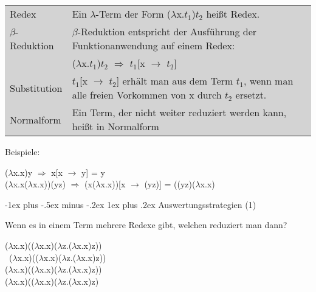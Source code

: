 \documentclass[10pt]{article}
\makeatletter
\renewcommand{\subsubsection}{\@startsection{subsubsection}{3}{0mm}%
                                {-1ex plus -.5ex minus -.2ex}%
                                {1ex plus .2ex}%
                                {\normalfont\small\bfseries}}
\makeatother
\begin{document}
\colorbox{lightgray}{ \begin{minipage}[h]{1.0\linewidth}
    \begin{tabular}{|p{4cm}|p{7cm}|}
      Redex             & Ein $\lambda$-Term der Form ($\lambda$x.$t_1$)$t_2$ heißt Redex.                                                      \\[\normalbaselineskip]
      $\beta$-Reduktion & $\beta$-Reduktion entspricht der Ausführung der Funktionanwendung auf einem Redex:                                    \\[\normalbaselineskip]
                        & ($\lambda$x.$t_1$)$t_2$ $\Rightarrow$ $t_1$[x $\rightarrow$ $t_2$]                                                    \\[\normalbaselineskip]
      Substitution      & $t_1$[x $\rightarrow$ $t_2$] erhält man aus dem Term $t_1$, wenn man alle freien Vorkommen von x durch $t_2$ ersetzt. \\[\normalbaselineskip]
      Normalform        & Ein Term, der nicht weiter reduziert werden kann, heißt in Normalform	 
    \end{tabular}
  \end{minipage}
}

Beispiele:   
\begin{center}
  ($\lambda$x.x)y $\Rightarrow$ x[x $\rightarrow$ y] = y \\[\normalbaselineskip]
  ($\lambda$x.x($\lambda$x.x))(yz) $\Rightarrow$ (x($\lambda$x.x))[x $\rightarrow$ (yz)] = ((yz)($\lambda$x.x)
\end{center}

\subsubsection{Auswertungsstrategien (1)}

Wenn es in einem Term mehrere Redexe gibt, welchen reduziert man dann?

\begin{center}
  ($\lambda$x.x)(($\lambda$x.x)($\lambda$z.($\lambda$x.x)z))\\
  \ ($\lambda$\color{blue}x.x\color{black})\color{red}(($\lambda$x.x)($\lambda$z.($\lambda$x.x)z)) \color{black}\\
  ($\lambda$x.x)(($\lambda$\color{blue}x.x\color{black})\color{red}($\lambda$z.($\lambda$x.x)z)\color{black})\\
  ($\lambda$x.x)(($\lambda$x.x)($\lambda$z.($\lambda$\color{blue}x.x\color{black})\color{red}z\color{black})\\
  
\end{center}
\end{document}
